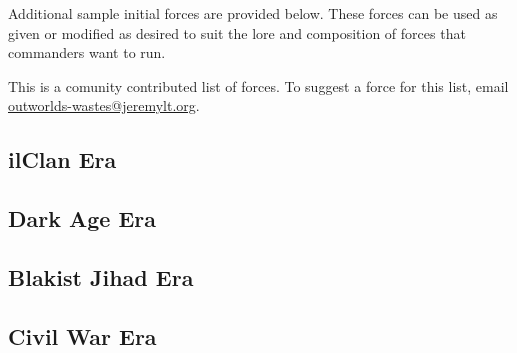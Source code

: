 Additional sample initial forces are provided below.
These forces can be used as given or modified as desired to suit the lore and composition of forces that commanders want to run.

This is a comunity contributed list of forces.
To suggest a force for this list, email \href{mailto:outworlds-wastes@jeremylt.org}{outworlds-wastes@jeremylt.org}.

\subsection{ilClan Era}





\subsection{Dark Age Era}



\subsection{Blakist Jihad Era}





\subsection{Civil War Era}





